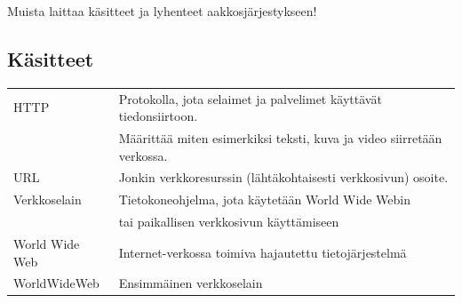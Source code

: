 \documentclass[finnish, 12pt, a4paper, elec, utf8, a-1b, online]{aaltothesis}
\date{XX.XX.2022}
\begin{document}
\makecoverpage{}

\makecopyrightpage{}

\begin{abstractpage}[finnish]
  \abstracttext{}
\end{abstractpage}


\newpage

\thesistableofcontents


Muista laittaa käsitteet ja lyhenteet aakkosjärjestykseen!

\subsection*{Käsitteet}
\begin{tabular}{ll}
  HTTP            & Protokolla, jota selaimet ja palvelimet käyttävät tiedonsiirtoon. \\
                  & Määrittää miten esimerkiksi teksti, kuva ja video siirretään verkossa. \\
  URL             & Jonkin verkkoresurssin (lähtäkohtaisesti verkkosivun) osoite.\\
  Verkkoselain    & Tietokoneohjelma, jota käytetään World Wide Webin \\
                  & tai paikallisen verkkosivun käyttämiseen \\
  World Wide Web  & Internet-verkossa toimiva hajautettu tietojärjestelmä \\
  WorldWideWeb    & Ensimmäinen verkkoselain
\end{tabular}
\end{document}
